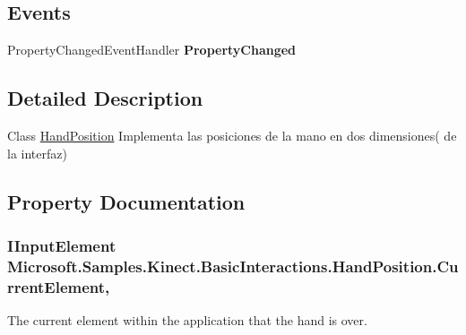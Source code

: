 \subsection*{Events}
\begin{DoxyCompactItemize}
\item 
\hypertarget{class_microsoft_1_1_samples_1_1_kinect_1_1_basic_interactions_1_1_hand_position_ad3aca18b41e40db6276afb081fc02faf}{Property\-Changed\-Event\-Handler {\bfseries Property\-Changed}}\label{class_microsoft_1_1_samples_1_1_kinect_1_1_basic_interactions_1_1_hand_position_ad3aca18b41e40db6276afb081fc02faf}

\end{DoxyCompactItemize}


\subsection{Detailed Description}
Class \hyperlink{class_microsoft_1_1_samples_1_1_kinect_1_1_basic_interactions_1_1_hand_position}{Hand\-Position} Implementa las posiciones de la mano en dos dimensiones( de la interfaz) 

\subsection{Property Documentation}
\hypertarget{class_microsoft_1_1_samples_1_1_kinect_1_1_basic_interactions_1_1_hand_position_a0642ac3c10c9795a47723332a1bdcbfd}{
\subsubsection[{Current\-Element}]{\setlength{\rightskip}{0pt plus 5cm}I\-Input\-Element Microsoft.\-Samples.\-Kinect.\-Basic\-Interactions.\-Hand\-Position.\-Current\-Element\hspace{0.3cm}{\ttfamily [get]}, {\ttfamily [set]}}}\label{class_microsoft_1_1_samples_1_1_kinect_1_1_basic_interactions_1_1_hand_position_a0642ac3c10c9795a47723332a1bdcbfd}


The current element within the application that the hand is over. 

